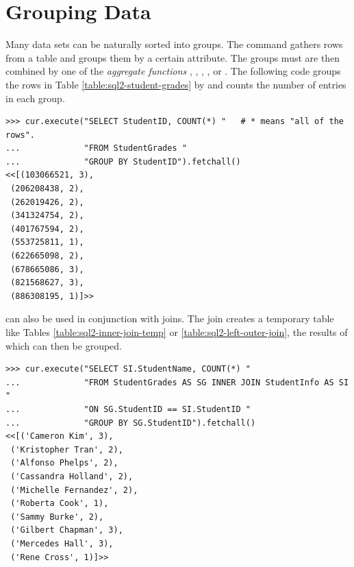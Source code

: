 \section*{Grouping Data} %


Many data sets can be naturally sorted into groups.
The  command gathers rows from a table and groups them by a certain attribute.
The groups must are then combined by one of the \emph{aggregate functions} , , , , or .
The following code groups the rows in Table \ref{table:sql2-student-grades} by  and counts the number of entries in each group.

\begin{lstlisting}
>>> cur.execute("SELECT StudentID, COUNT(*) "   # * means "all of the rows".
...             "FROM StudentGrades "
...             "GROUP BY StudentID").fetchall()
<<[(103066521, 3),
 (206208438, 2),
 (262019426, 2),
 (341324754, 2),
 (401767594, 2),
 (553725811, 1),
 (622665098, 2),
 (678665086, 3),
 (821568627, 3),
 (886308195, 1)]>>
\end{lstlisting}

 can also be used in conjunction with joins.
The join creates a temporary table like Tables \ref{table:sql2-inner-join-temp} or \ref{table:sql2-left-outer-join}, the results of which can then be grouped.

\begin{lstlisting}
>>> cur.execute("SELECT SI.StudentName, COUNT(*) "
...             "FROM StudentGrades AS SG INNER JOIN StudentInfo AS SI "
...             "ON SG.StudentID == SI.StudentID "
...             "GROUP BY SG.StudentID").fetchall()
<<[('Cameron Kim', 3),
 ('Kristopher Tran', 2),
 ('Alfonso Phelps', 2),
 ('Cassandra Holland', 2),
 ('Michelle Fernandez', 2),
 ('Roberta Cook', 1),
 ('Sammy Burke', 2),
 ('Gilbert Chapman', 3),
 ('Mercedes Hall', 3),
 ('Rene Cross', 1)]>>
\end{lstlisting}

